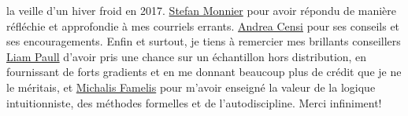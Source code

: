 la veille d'un hiver froid en 2017. \href{https://www.iro.umontreal.ca/~monnier/}{Stefan Monnier} pour avoir répondu de manière réfléchie et approfondie à mes courriels errants. \href{https://censi.science/}{Andrea Censi} pour ses conseils et ses encouragements. Enfin et surtout, je tiens à remercier mes brillants conseillers \href{http://liampaull.ca/}{Liam Paull} d'avoir pris une chance sur un échantillon hors distribution, en fournissant de forts gradients et en me donnant beaucoup plus de crédit que je ne le méritais, et \href{https://michalis.famelis.info/}{Michalis Famelis} pour m'avoir enseigné la valeur de la logique intuitionniste, des méthodes formelles et de l'autodiscipline. Merci infiniment!
